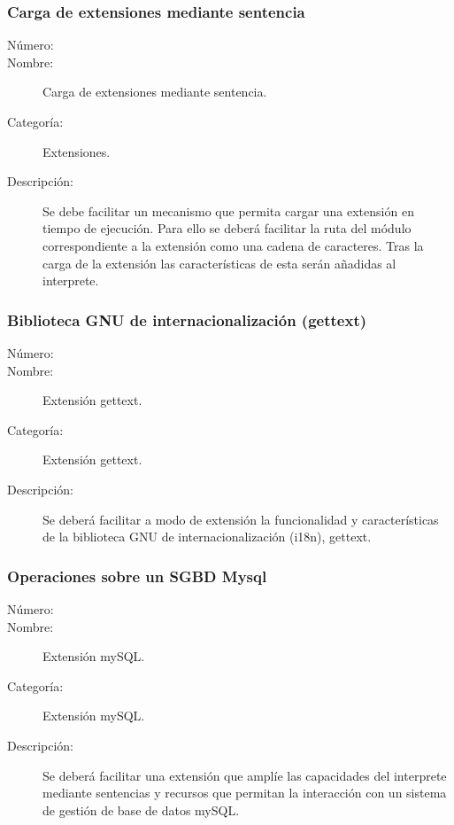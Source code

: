 \subsubsection{Carga de extensiones mediante sentencia}
\begin{framed}
	\begin{description}
		\item [Número:] \cn
		\item [Nombre:] Carga de extensiones mediante sentencia.
		\item [Categoría:] Extensiones.
		\item [Descripción:] Se debe facilitar un mecanismo que permita cargar una extensión en tiempo de ejecución. Para ello se deberá
      facilitar la ruta del módulo correspondiente a la extensión como una cadena de caracteres. Tras la carga de la extensión las 
      características de esta serán añadidas al interprete.
	\end{description}
\end{framed}

\subsubsection{Biblioteca GNU de internacionalización (gettext)}
\begin{framed}
	\begin{description}
		\item [Número:] \cn
		\item [Nombre:] Extensión gettext.
		\item [Categoría:] Extensión gettext.
		\item [Descripción:] Se deberá facilitar a modo de extensión la funcionalidad y características de la 
      biblioteca GNU de internacionalización (i18n), gettext. 
	\end{description}
\end{framed}

\subsubsection{Operaciones sobre un SGBD Mysql}
\begin{framed}
	\begin{description}
		\item [Número:] \cn
		\item [Nombre:] Extensión mySQL.
		\item [Categoría:] Extensión mySQL.
		\item [Descripción:] Se deberá facilitar una extensión que amplíe las capacidades del interprete mediante 
      sentencias y recursos que permitan la interacción con un sistema de gestión de base de datos mySQL.
	\end{description}
\end{framed}
